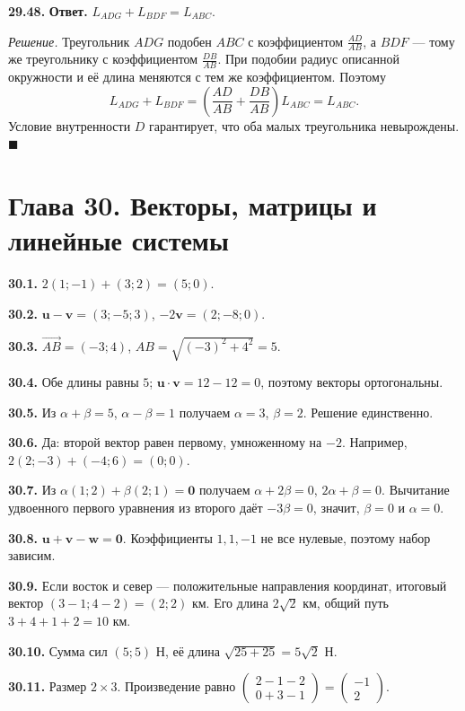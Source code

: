 \documentclass[12pt,a4paper,oneside,openany]{book}
\theoremstyle{colordef}\newtheorem{definition}{Определение}[chapter]
\theoremstyle{plain}\newtheorem{theorem}{Теорема}[chapter]
\theoremstyle{definition}\newtheorem{axiom}{Аксиома}[chapter]
\begin{document}
\textbf{29.48.} \textbf{Ответ.} \(L_{ADG}+L_{BDF}=L_{ABC}\).\par\nopagebreak[4]\textit{Решение.} Треугольник \(ADG\) подобен \(ABC\) с коэффициентом \(\frac{AD}{AB}\), а \(BDF\) — тому же треугольнику с коэффициентом \(\frac{DB}{AB}\). При подобии радиус описанной окружности и её длина меняются с тем же коэффициентом. Поэтому \[L_{ADG}+L_{BDF}=\left(\frac{AD}{AB}+\frac{DB}{AB}\right)L_{ABC}=L_{ABC}.\] Условие внутренности \(D\) гарантирует, что оба малых треугольника невырождены.\hfill\(\blacksquare\)\par
\endgroup
\section*{Глава 30. Векторы, матрицы и линейные системы}
\begingroup\setlength{\parskip}{3pt}
\textbf{30.1.} \(2(1;-1)+(3;2)=(5;0)\).\par
\textbf{30.2.} \(\symbf u-\symbf v=(3;-5;3)\), \(-2\symbf v=(2;-8;0)\).\par
\textbf{30.3.} \(\overrightarrow{AB}=(-3;4)\), \(AB=\sqrt{(-3)^2+4^2}=5\).\par
\textbf{30.4.} Обе длины равны \(5\); \(\symbf u\cdot\symbf v=12-12=0\), поэтому векторы ортогональны.\par
\textbf{30.5.} Из \(\alpha+\beta=5\), \(\alpha-\beta=1\) получаем \(\alpha=3\), \(\beta=2\). Решение единственно.\par
\textbf{30.6.} Да: второй вектор равен первому, умноженному на \(-2\). Например, \(2(2;-3)+(-4;6)=(0;0)\).\par
\textbf{30.7.} Из \(\alpha(1;2)+\beta(2;1)=\symbf0\) получаем \(\alpha+2\beta=0\), \(2\alpha+\beta=0\). Вычитание удвоенного первого уравнения из второго даёт \(-3\beta=0\), значит, \(\beta=0\) и \(\alpha=0\).\par
\textbf{30.8.} \(\symbf u+\symbf v-\symbf w=\symbf0\). Коэффициенты \(1,1,-1\) не все нулевые, поэтому набор зависим.\par
\textbf{30.9.} Если восток и север — положительные направления координат, итоговый вектор \((3-1;4-2)=(2;2)\) км. Его длина \(2\sqrt2\) км, общий путь \(3+4+1+2=10\) км.\par
\textbf{30.10.} Сумма сил \((5;5)\) Н, её длина \(\sqrt{25+25}=5\sqrt2\) Н.\par
\textbf{30.11.} Размер \(2\times3\). Произведение равно \(\begin{pmatrix}2-1-2\\0+3-1\end{pmatrix}=\begin{pmatrix}-1\\2\end{pmatrix}\).\par
\end{document}
